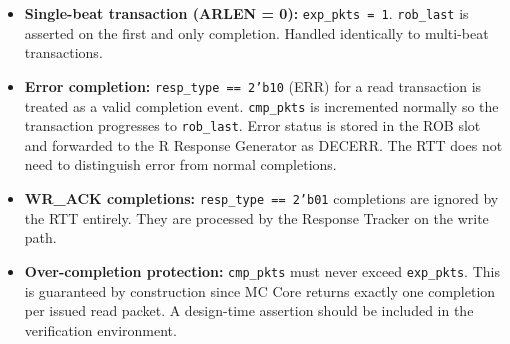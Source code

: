 \documentclass[11pt,a4paper]{article}
\begin{document}
\begin{itemize}
  \item \textbf{Single-beat transaction (ARLEN = 0):} \texttt{exp\_pkts = 1}.
        \texttt{rob\_last} is asserted on the first and only completion.
        Handled identically to multi-beat transactions.
  \item \textbf{Error completion:} \texttt{resp\_type == 2'b10} (ERR)
        for a read transaction is treated as a valid completion event.
        \texttt{cmp\_pkts} is incremented normally so the transaction
        progresses to \texttt{rob\_last}. Error status is stored in the
        ROB slot and forwarded to the R Response Generator as DECERR.
        The RTT does not need to distinguish error from normal
        completions.
  \item \textbf{WR\_ACK completions:} \texttt{resp\_type == 2'b01}
        completions are ignored by the RTT entirely. They are processed
        by the Response Tracker on the write path.
  \item \textbf{Over-completion protection:} \texttt{cmp\_pkts} must
        never exceed \texttt{exp\_pkts}. This is guaranteed by
        construction since MC Core returns exactly one completion per
        issued read packet. A design-time assertion should be included
        in the verification environment.
\end{itemize}
\end{document}

